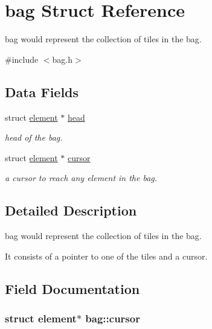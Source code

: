 \hypertarget{structbag}{\section{bag Struct Reference}
\label{structbag}
}


bag would represent the collection of tiles in the bag.  




{\ttfamily \#include $<$bag.\-h$>$}

\subsection*{Data Fields}
\begin{DoxyCompactItemize}
\item 
struct \hyperlink{structelement}{element} $\ast$ \hyperlink{structbag_a9c1cd8fc1f57914986d31ebe01091cf4}{head}
\begin{DoxyCompactList}\small\item\em head of the bag. \end{DoxyCompactList}\item 
struct \hyperlink{structelement}{element} $\ast$ \hyperlink{structbag_ac677a8e6741303461c463a2303c74594}{cursor}
\begin{DoxyCompactList}\small\item\em a cursor to reach any element in the bag. \end{DoxyCompactList}\end{DoxyCompactItemize}


\subsection{Detailed Description}
bag would represent the collection of tiles in the bag. 

It consists of a pointer to one of the tiles and a cursor. 

\subsection{Field Documentation}
\hypertarget{structbag_ac677a8e6741303461c463a2303c74594}{
\subsubsection[{cursor}]{\setlength{\rightskip}{0pt plus 5cm}struct {\bf element}$\ast$ bag\-::cursor}}\label{structbag_ac677a8e6741303461c463a2303c74594}


